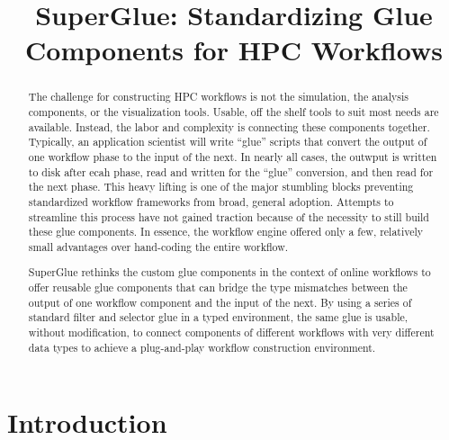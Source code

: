 \documentclass[conference]{IEEEtran}
\begin{document}
\title{SuperGlue: Standardizing Glue Components for HPC Workflows}

\author{

}

\maketitle

\begin{abstract}

The challenge for constructing HPC workflows is not the simulation, the
analysis components, or the visualization tools. Usable, off the shelf tools to
suit most needs are available. Instead, the labor and complexity is connecting
these components together. Typically, an application scientist will write
``glue'' scripts that convert the output of one workflow phase to the input of
the next.  In nearly all cases, the outwput is written to disk after ecah
phase, read and written for the ``glue'' conversion, and then read for the next
phase. This heavy lifting is one of the major stumbling blocks preventing
standardized workflow frameworks from broad, general adoption. Attempts to
streamline this process have not gained traction because of the necessity to
still build these glue components. In essence, the workflow engine offered only
a few, relatively small advantages over hand-coding the entire workflow.

SuperGlue rethinks the custom glue components in the context of online
workflows to offer reusable glue components that can bridge the type mismatches
between the output of one workflow component and the input of the next. By
using a series of standard filter and selector glue in a typed environment, the
same glue is usable, without modification, to connect components of different
workflows with very different data types to achieve a plug-and-play workflow
construction environment.

\end{abstract}



\section{Introduction}
\label{s:intro}
\end{document}
